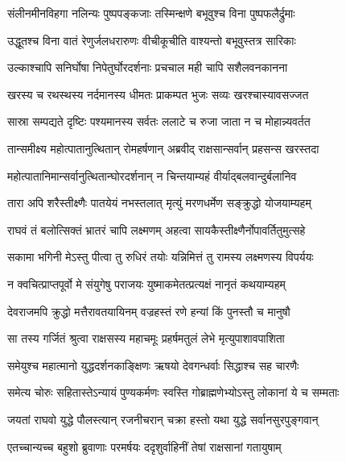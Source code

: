 \twolineshloka
{संलीनमीनविहगा नलिन्यः पुष्पपङ्कजाः}
{तस्मिन्क्षणे बभूवुश्च विना पुष्पफलैर्द्रुमाः} %

\twolineshloka
{उद्धूतश्च विना वातं रेणुर्जलधरारुणः}
{वीचीकूचीति वाश्यन्तो बभूवुस्तत्र सारिकाः} %

\twolineshloka
{उल्काश्चापि सनिर्घोषा निपेतुर्घोरदर्शनाः}
{प्रचचाल मही चापि सशैलवनकानना} %

\twolineshloka
{खरस्य च रथस्थस्य नर्दमानस्य धीमतः}
{प्राकम्पत भुजः सव्यः खरश्चास्यावसज्जत} %

\twolineshloka
{सास्रा सम्पद्यते दृष्टिः पश्यमानस्य सर्वतः}
{ललाटे च रुजा जाता न च मोहान्न्यवर्तत} %

\twolineshloka
{तान्समीक्ष्य महोत्पातानुत्थितान् रोमहर्षणान्}
{अब्रवीद् राक्षसान्सर्वान् प्रहसन्स खरस्तदा} %

\twolineshloka
{महोत्पातानिमान्सर्वानुत्थितान्घोरदर्शनान्}
{न चिन्तयाम्यहं वीर्याद्बलवान्दुर्बलानिव} %

\twolineshloka
{तारा अपि शरैस्तीक्ष्णैः पातयेयं नभस्तलात्}
{मृत्युं मरणधर्मेण सङ्क्रुद्धो योजयाम्यहम्} %

\twolineshloka
{राघवं तं बलोत्सिक्तं भ्रातरं चापि लक्ष्मणम्}
{अहत्वा सायकैस्तीक्ष्णैर्नोपावर्तितुमुत्सहे} %

\twolineshloka
{सकामा भगिनी मेऽस्तु पीत्वा तु रुधिरं तयोः}
{यन्निमित्तं तु रामस्य लक्ष्मणस्य विपर्ययः} %

\twolineshloka
{न क्वचित्प्राप्तपूर्वो मे संयुगेषु पराजयः}
{युष्माकमेतत्प्रत्यक्षं नानृतं कथयाम्यहम्} %

\twolineshloka
{देवराजमपि क्रुद्धो मत्तैरावतयायिनम्}
{वज्रहस्तं रणे हन्यां किं पुनस्तौ च मानुषौ} %

\twolineshloka
{सा तस्य गर्जितं श्रुत्वा राक्षसस्य महाचमूः}
{प्रहर्षमतुलं लेभे मृत्युपाशावपाशिता} %

\twolineshloka
{समेयुश्च महात्मानो युद्धदर्शनकाङ्क्षिणः}
{ऋषयो देवगन्धर्वाः सिद्धाश्च सह चारणैः} %

\twolineshloka
{समेत्य चोरुः सहितास्तेऽन्यायं पुण्यकर्मणः}
{स्वस्ति गोब्राह्मणेभ्योऽस्तु लोकानां ये च सम्मताः} %

\twolineshloka
{जयतां राघवो युद्धे पौलस्त्यान् रजनीचरान्}
{चक्रा हस्तो यथा युद्धे सर्वानसुरपुङ्गवान्} %

\twolineshloka
{एतच्चान्यच्च बहुशो ब्रुवाणाः परमर्षयः}
{ददृशुर्वाहिनीं तेषां राक्षसानां गतायुषाम्} %

